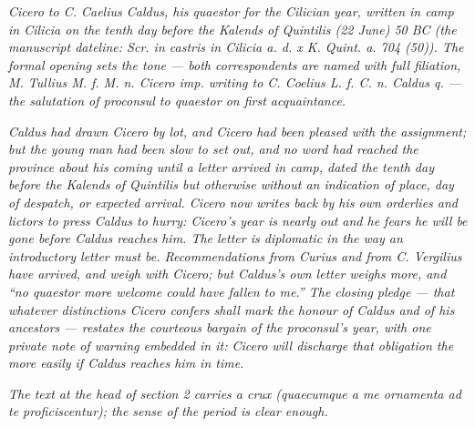 
\textit{Cicero to C. Caelius Caldus, his quaestor for the Cilician
year, written in camp in Cilicia on the tenth day before the Kalends
of Quintilis (22 June) 50 BC (the manuscript dateline: \textit{Scr.
in castris in Cilicia a. d. x K. Quint. a. 704 (50)}). The formal
opening sets the tone --- both correspondents are named with full
filiation, \textit{M. Tullius M. f. M. n. Cicero imp.} writing to
\textit{C. Coelius L. f. C. n. Caldus q.} --- the salutation of
proconsul to quaestor on first acquaintance.}

\textit{Caldus had drawn Cicero by lot, and Cicero had been pleased
with the assignment; but the young man had been slow to set out, and
no word had reached the province about his coming until a letter
arrived in camp, dated the tenth day before the Kalends of Quintilis
but otherwise without an indication of place, day of despatch, or
expected arrival. Cicero now writes back by his own orderlies and
lictors to press Caldus to hurry: Cicero's year is nearly out and he
fears he will be gone before Caldus reaches him. The letter is
diplomatic in the way an introductory letter must be. Recommendations
from Curius and from C. Vergilius have arrived, and weigh with Cicero;
but Caldus's own letter weighs more, and ``no quaestor more welcome
could have fallen to me.'' The closing pledge --- that whatever
distinctions Cicero confers shall mark the honour of Caldus and of
his ancestors --- restates the courteous bargain of the proconsul's
year, with one private note of warning embedded in it: Cicero will
discharge that obligation \textit{the more easily} if Caldus reaches
him in time.}

\textit{The text at the head of section 2 carries a crux
(\textit{quaecumque a me ornamenta \dag ad te proficiscentur}); the
sense of the period is clear enough.}
